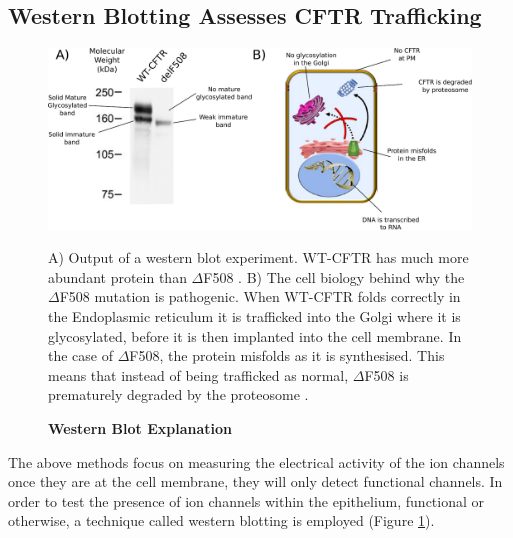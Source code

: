 \subsection{Western Blotting Assesses CFTR Trafficking}
\begin{figure}
	\begin{center}
	\includegraphics[width=1\textwidth]{figures/western_blot_explanation.pdf}
	\end{center}
	\captionsetup{singlelinecheck = false, justification=raggedright}
	\caption[Western Blot Explanation] {\textbf{Western Blot Explanation}}{A) Output of a western blot experiment. WT-CFTR has much more abundant protein than $\Delta$F508 \cite{chang2008}. B) The cell biology behind why the $\Delta$F508 mutation is pathogenic. When WT-CFTR folds correctly in the Endoplasmic reticulum it is trafficked into the Golgi where it is glycosylated, before it is then implanted into the cell membrane. In the case of $\Delta$F508, the protein misfolds as it is synthesised. This means that instead of being trafficked as normal, $\Delta$F508 is prematurely degraded by the proteosome \cite{lopes-pacheco2016a, lewis2005}.} 
	\label{western_blot}
\end{figure}
The above methods focus on measuring the electrical activity of the ion channels once they are at the cell membrane, they will only detect functional channels. In order to test the presence of ion channels within the epithelium, functional or otherwise, a technique called western blotting is employed (Figure \ref{western_blot}).

